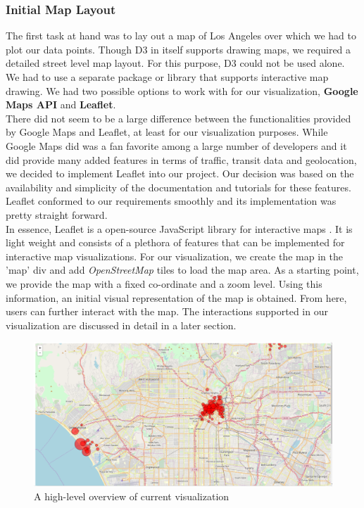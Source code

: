 \subsubsection{Initial Map Layout}
The first task at hand was to lay out a map of Los Angeles over which we had to plot our data points. Though D3 in itself supports drawing maps, we required a detailed street level map layout. For this purpose, D3 could not be used alone. We had to use a separate package or library that supports interactive map drawing. We had two possible options to work with for our visualization, \textbf{Google Maps API} and \textbf{Leaflet}.\\
There did not seem to be a large difference between the functionalities provided by Google Maps and Leaflet, at least for our visualization purposes. While Google Maps did was a fan favorite among a large number of developers and it did provide many added features in terms of traffic, transit data and geolocation, we decided to implement Leaflet into our project. Our decision was based on the availability and simplicity of the documentation and tutorials for these features. Leaflet conformed to our requirements smoothly and its implementation was pretty straight forward.\\
In essence, Leaflet is a open-source JavaScript library for interactive maps \cite{Leaflet:2017:Doc}. It is light weight and consists of a plethora of features that can be implemented for interactive map visualizations. For our visualization, we create the map in the 'map' div and add \textit{OpenStreetMap} tiles to load the map area. As a starting point, we provide the map with a fixed co-ordinate and a zoom level. Using this information, an initial visual representation of the map is obtained. From here, users can further interact with the map. The interactions supported in our visualization are discussed in detail in a later section.
\begin{figure}[h]
	\centering %
	\includegraphics[scale=0.20]{figs/highlevel.PNG}
	\caption{\footnotesize{A high-level overview of current visualization}}
	\label{fig:First viz Chart}
	\captionsetup{justification=centering,margin=1cm}
	\vspace{-10pt}
\end{figure}
